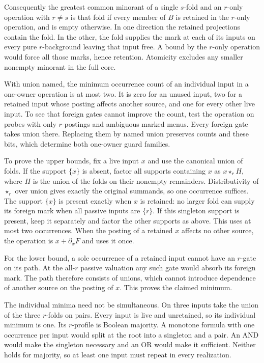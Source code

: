 Consequently the greatest common minorant of a single
$s$-fold and an $r$-only operation with $r\ne s$ is that fold
if every member of $B$ is retained in the $r$-only operation,
and is empty otherwise. In one direction the retained
projections contain the fold. In the other, the fold supplies
the mark at each of its inputs on every pure $r$-background
leaving that input free. A bound by the $r$-only operation
would force all those marks, hence retention. Atomicity
excludes any smaller nonempty minorant in the full core.

With union named, the minimum occurrence count
of an individual input in a one-owner operation
is at most two. It is zero for an unused input,
two for a retained input whose posting affects
another source, and one for every other live
input. To see that foreign gates cannot improve
the count, test the operation on probes with only
$r$-postings and ambiguous marked menus. Every
foreign gate takes union there. Replacing them
by named union preserves counts and these bits,
which determine both one-owner guard families.

To prove the upper bounds, fix a live input $x$
and use the canonical union of folds. If the
support $\{x\}$ is absent, factor all supports
containing $x$ as $x\star_r H$, where $H$ is the
union of the folds on their nonempty remainders.
Distributivity of $\star_r$ over union gives
exactly the original summands, so one occurrence
suffices. The support $\{x\}$ is present exactly
when $x$ is retained: no larger fold can supply
its foreign mark when all passive inputs are
$\{r\}$. If this singleton support is present,
keep it separately and factor the other supports
as above. This uses at most two occurrences.
When the posting of a retained $x$ affects no
other source, the operation is $x+\partial_x F$
and uses it once.

For the lower bound, a sole occurrence of a
retained input cannot have an $r$-gate on its
path. At the all-$r$ passive valuation any such
gate would absorb its foreign mark. The path
therefore consists of unions, which cannot
introduce dependence of another source on the
posting of $x$. This proves the claimed minimum.

The individual minima need not be simultaneous.
On three inputs take the union of the three
$r$-folds on pairs. Every input is live and
unretained, so its individual minimum is one.
Its $r$-profile is Boolean majority. A monotone
formula with one occurrence per input would
split at the root into a singleton and a pair.
An AND would make the singleton necessary and
an OR would make it sufficient. Neither holds
for majority, so at least one input must repeat
in every realization.

